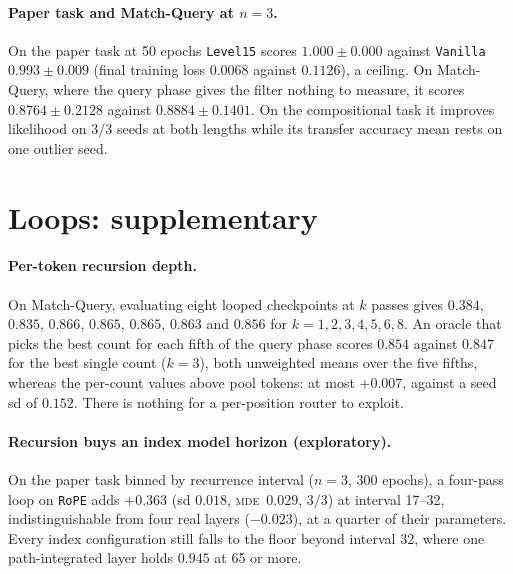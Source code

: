 \documentclass[10pt]{article}
\newcommand{\mde}{\textsc{mde}}
\newcommand{\arm}[1]{\texttt{#1}}
\begin{document}
\paragraph{Paper task and Match-Query at $n=3$.} On the paper task at 50 epochs \arm{Level15} scores
$1.000\pm0.000$ against \arm{Vanilla} $0.993\pm0.009$ (final training loss $0.0068$ against $0.1126$), a ceiling. On
Match-Query, where the query phase gives the filter nothing to measure, it scores $0.8764\pm0.2128$ against
$0.8884\pm0.1401$. On the compositional task it improves likelihood on $3/3$ seeds at both lengths while its
transfer accuracy mean rests on one outlier seed. %

\section{Loops: supplementary}
\label{app:loops}

\paragraph{Per-token recursion depth.} On Match-Query, evaluating eight looped checkpoints at $k$ passes gives
$0.384$, $0.835$, $0.866$, $0.865$, $0.865$, $0.863$ and $0.856$ for $k=1,2,3,4,5,6,8$. An oracle that picks the best
count for each fifth of the query phase scores $0.854$ against $0.847$ for the best single count ($k=3$), both
unweighted means over the five fifths, whereas the per-count values above pool tokens: at most
$+0.007$, against a seed sd of $0.152$. There is nothing for a per-position router to exploit.

\paragraph{Recursion buys an index model horizon (exploratory).} On the paper task binned by recurrence interval ($n=3$, 300
epochs), a four-pass loop on \arm{RoPE} adds $+0.363$ (sd $0.018$, \mde\ $0.029$, $3/3$) at interval 17--32,
indistinguishable from four real layers ($-0.023$), at a quarter of their parameters. Every index configuration
still falls to the floor beyond interval 32, where one path-integrated layer holds $0.945$ at 65 or more.
\end{document}
